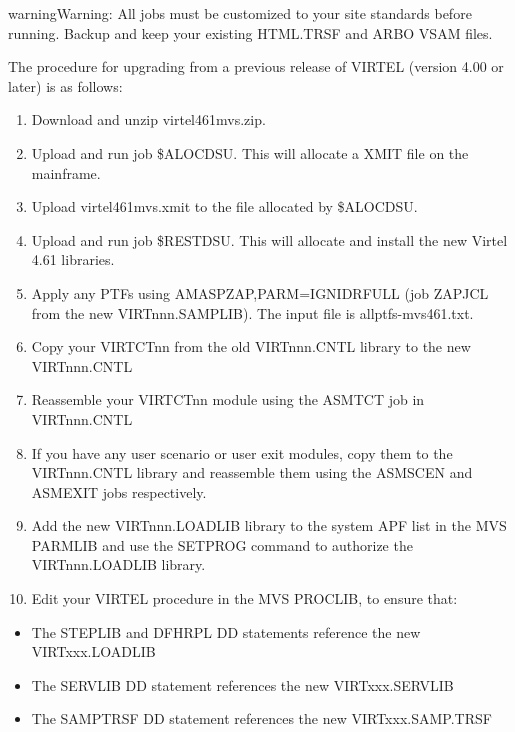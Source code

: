 \documentclass[letterpaper,10pt,english]{sphinxmanual}
\begin{document}
\begin{sphinxadmonition}{warning}{Warning:}
All jobs must be customized to your site standards before running. Backup and keep your existing HTML.TRSF and ARBO VSAM files.
\end{sphinxadmonition}

The procedure for upgrading from a previous release of VIRTEL (version 4.00 or later) is as follows:
\begin{enumerate}
\def\theenumi{\arabic{enumi}}
\def\labelenumi{\theenumi .}
\makeatletter\def\p@enumii{\p@enumi \theenumi .}\makeatother
\item {} 
Download and unzip virtel461mvs.zip.

\item {} 
Upload and run job \$ALOCDSU. This will allocate a XMIT file on the mainframe.

\item {} 
Upload virtel461mvs.xmit to the file allocated by \$ALOCDSU.

\item {} 
Upload and run job \$RESTDSU. This will allocate and install the new Virtel 4.61 libraries.

\item {} 
Apply any PTFs using AMASPZAP,PARM=IGNIDRFULL (job ZAPJCL from the new VIRTnnn.SAMPLIB). The input file is allptfs-mvs461.txt.

\item {} 
Copy your VIRTCTnn from the old VIRTnnn.CNTL library to the new VIRTnnn.CNTL

\item {} 
Reassemble your VIRTCTnn module using the ASMTCT job in VIRTnnn.CNTL

\item {} 
If you have any user scenario or user exit modules, copy them to the VIRTnnn.CNTL library and reassemble them using the ASMSCEN and ASMEXIT jobs respectively.

\item {} 
Add the new VIRTnnn.LOADLIB library to the system APF list in the MVS PARMLIB and use the SETPROG command to authorize the VIRTnnn.LOADLIB library.

\item {} 
Edit your VIRTEL procedure in the MVS PROCLIB, to ensure that:

\end{enumerate}
\begin{itemize}
\item {} 
The STEPLIB and DFHRPL DD statements reference the new VIRTxxx.LOADLIB

\item {} 
The SERVLIB DD statement references the new VIRTxxx.SERVLIB

\item {} 
The SAMPTRSF DD statement references the new VIRTxxx.SAMP.TRSF

\end{itemize}
\end{document}
